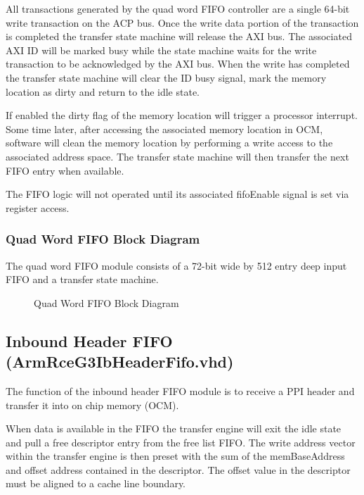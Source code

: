 \documentclass[11pt]{article}
\begin{document}
All transactions generated by the quad word FIFO controller are a single 64-bit write transaction on the ACP bus. Once the write data portion
of the transaction is completed the transfer state machine will release the AXI bus. The associated AXI ID will be marked busy while the state 
machine waits for the write transaction to be acknowledged by the AXI bus.  When the write has completed the transfer state machine will clear 
the ID busy signal, mark the memory location as dirty and return to the idle state. 

If enabled the dirty flag of the memory location will trigger a processor interrupt. Some time later, after accessing the associated memory location 
in OCM, software will clean the memory location by performing a write access to the associated address space. The transfer state machine will
then transfer the next FIFO entry when available.

The FIFO logic will not operated until its associated fifoEnable signal is set via register access.

\subsubsection{Quad Word FIFO Block Diagram}

The quad word FIFO module consists of a 72-bit wide by 512 entry deep input FIFO and a transfer state machine.

\begin{figure}[H]
   \centering
   \caption{Quad Word FIFO Block Diagram}
   \label{fig:qw_fifo_block}
\end{figure}

\subsection{Inbound Header FIFO (ArmRceG3IbHeaderFifo.vhd)}
\label{subsec:ArmRceG3IbHeaderFifo}

The function of the inbound header FIFO module is to receive a PPI header and transfer it into on chip memory (OCM). 

When data is available in the FIFO the transfer engine will exit the idle state and pull a free descriptor entry
from the free list FIFO. The write address vector within the transfer engine is then preset with the sum of the
memBaseAddress and offset address contained in the descriptor. The offset value in the descriptor must be aligned to 
a cache line boundary.
\end{document}
